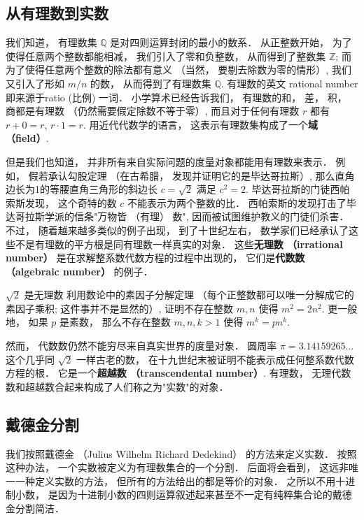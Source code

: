 
\subsection{从有理数到实数}

我们知道， 有理数集 $\mathbb{Q}$ 是对四则运算封闭的最小的数系． 从正整数开始， 为了使得任意两个整数都能相减， 我们引入了零和负整数， 从而得到了整数集 $\mathbb{Z}$; 而为了使得任意两个整数的除法都有意义 （当然， 要剔去除数为零的情形）, 我们又引入了形如 $m/n$ 的数， 从而得到了有理数集 $\mathbb{Q}$. 有理数的英文 rational number 即来源于ratio (比例) 一词． 小学算术已经告诉我们， 有理数的和， 差， 积， 商都是有理数 （仍然需要假定除数不等于零）, 而且对于任何有理数 $r$ 都有 $r+0=r$, $r\cdot1=r$. 用近代代数学的语言， 这表示有理数集构成了一个\textbf{域 （field）}.

但是我们也知道， 并非所有来自实际问题的度量对象都能用有理数来表示． 例如， 假若承认勾股定理 （在古希腊， 发现并证明它的是毕达哥拉斯）, 那么直角边长为1的等腰直角三角形的斜边长 $c=\sqrt{2}$ 满足 $c^2=2$. 毕达哥拉斯的门徒西帕索斯发现， 这个奇特的数 $c$ 不能表示为两个整数的比． 西帕索斯的发现打击了毕达哥拉斯学派的信条"万物皆 （有理） 数", 因而被试图维护教义的门徒们杀害． 不过， 随着越来越多类似的例子出现， 到了十世纪左右， 数学家们已经承认了这些不是有理数的平方根是同有理数一样真实的对象． 这些\textbf{无理数 （irrational number）} 是在求解整系数代数方程的过程中出现的， 它们是\textbf{代数数 （algebraic number）} 的例子．

\begin{exercise}{$\sqrt{2}$ 是无理数}
利用数论中的素因子分解定理 （每个正整数都可以唯一分解成它的素因子乘积; 这件事并不是显然的）, 证明不存在整数 $m,n$ 使得 $m^2=2n^2$. 更一般地， 如果 $p$ 是素数， 那么不存在整数 $m,n,k>1$ 使得 $m^k=pn^k$.
\end{exercise}

然而， 代数数仍然不能穷尽来自真实世界的度量对象． 圆周率 $\pi=3.14159265...$ 这个几乎同 $\sqrt{2}$ 一样古老的数， 在十九世纪末被证明不能表示成任何整系数代数方程的根． 它是一个\textbf{超越数 （transcendental number）}. 有理数， 无理代数数和超越数合起来构成了人们称之为"实数"的对象．

\subsection{戴德金分割}
我们按照戴德金 （Julius Wilhelm Richard Dedekind） 的方法来定义实数． 按照这种办法， 一个实数被定义为有理数集合的一个分割． 后面将会看到， 这远非唯一一种定义实数的方法， 但所有的方法给出的都是等价的对象． 之所以不用十进制小数， 是因为十进制小数的四则运算叙述起来甚至不一定有纯粹集合论的戴德金分割简洁．

